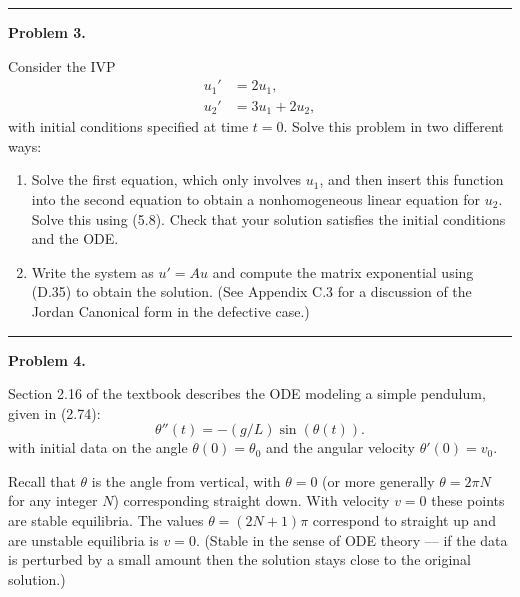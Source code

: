 \documentclass[10pt]{article}
\begin{document}



\vskip 1cm
\hrule
{\bf Problem 3.}


Consider the IVP
\begin{equation*}
\begin{split}
u_1' &= 2u_1,\\
u_2' &= 3u_1 + 2u_2,
\end{split}
\end{equation*}
with initial conditions specified at time $t=0$.  Solve this problem in two
different ways:

\begin{enumerate}
\item Solve the first equation, which only involves $u_1$, and then insert
this function into the second equation to obtain a nonhomogeneous linear
equation for $u_2$.  Solve this using (5.8).
Check that your solution satisfies the initial conditions and the ODE.

\item Write the system as $u' = Au$ and compute the matrix exponential using
(D.35) to obtain the solution.  (See Appendix C.3 for a discussion of the
Jordan Canonical form in the defective case.)
\end{enumerate}




\vskip 1cm
\hrule
{\bf Problem 4.}

Section 2.16 of the textbook describes the ODE modeling a simple pendulum,
given in (2.74):
\begin{equation}\label{pendulum}
\theta''(t) = -(g/L)\sin(\theta(t)).
\end{equation}
with initial data on the angle $\theta(0) = \theta_0$ and the angular velocity $\theta'(0) = v_0$.  


Recall that $\theta$ is the angle from vertical, with $\theta = 0$ (or 
more generally $\theta = 2\pi N$ for any integer $N$) corresponding straight
down.  With velocity
$v=0$ these points are stable equilibria.
The values $\theta = (2N+1)\pi$ correspond to straight up and are 
unstable equilibria is $v=0$.  (Stable in the sense of ODE theory --- if the
data is perturbed by a small amount then the solution stays close to the
original solution.)
\end{document}
